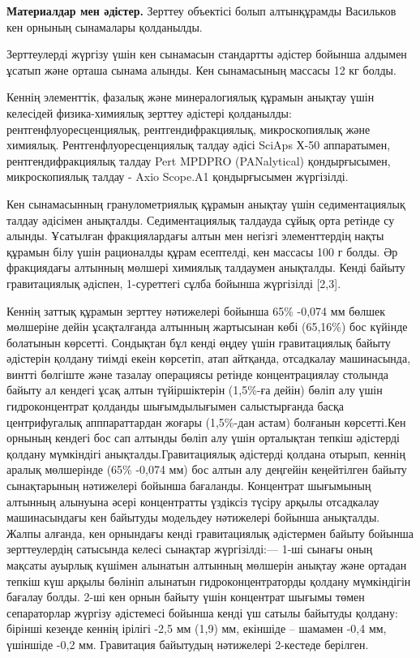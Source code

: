 \begin{multicols}{2}

{\bfseries Материалдар мен әдістер.} Зерттеу объектісі болып алтынқұрамды
Васильков кен орнының сынамалары қолданылды.

Зерттеулерді жүргізу үшін кен сынамасын стандартты әдістер бойынша
алдымен ұсатып және орташа сынама алынды. Кен сынамасының массасы 12 кг
болды.

Кеннің элементтік, фазалық және минералогиялық құрамын анықтау үшін
келесідей физика-химиялық зерттеу әдістері қолданылды:
рентгенфлуоресценциялық, рентгендифракциялық, микроскопиялық және
химиялық. Рентгенфлуоресценциялық талдау әдісі SciAps Х-50 аппаратымен,
рентгендифракциялық талдау Pert MPDPRO (PANalytical) қондырғысымен,
микроскопиялық талдау - Axio Scope.A1 қондырғысымен жүргізілді.

Кен сынамасынның гранулометриялық құрамын анықтау үшін седиментациялық
талдау әдісімен анықталды. Седиментациялық талдауда сұйық орта ретінде
су алынды. Ұсатылған фракциялардағы алтын мен негізгі элементтердің
нақты құрамын білу үшін рационалды құрам есептелді, кен массасы 100 г
болды. Әр фракциядағы алтынның мөлшері химиялық талдаумен анықталды.
Кенді байыту гравитациялық әдіспен, 1-суреттегі сұлба бойынша жүргізілді
{[}2,3{]}.

Кеннің заттық құрамын зерттеу нәтижелері бойынша 65\% -0,074 мм бөлшек
мөлшеріне дейін ұсақталғанда алтынның жартысынан көбі (65,16\%) бос
күйінде болатынын көрсетті. Сондықтан бұл кенді өңдеу үшін гравитациялық
байыту әдістерін қолдану тиімді екеін көрсетіп, атап айтқанда,
отсадкалау машинасында, винтті бөлгіште және тазалау операциясы ретінде
концентрациялау столында байыту ал кендегі ұсақ алтын түйіршіктерін
(1,5\%-ға дейін) бөліп алу үшін гидроконцентрат қолданды шығымдылығымен
салыстырғанда басқа центрифугалық апппараттардан жоғары (1,5\%-дан
астам) болғанын көрсетті.Кен орнының кендегі бос сап алтынды бөліп алу
үшін орталықтан тепкіш әдістерді қолдану мүмкіндігі
анықталды.Гравитациялық әдістерді қолдана отырып, кеннің аралық
мөлшерінде (65\% -0,074 мм) бос алтын алу деңгейін кеңейтілген байыту
сынақтарының нәтижелері бойынша бағаланды. Концентрат шығымының алтынның
алынуына әсері концентратты үздіксіз түсіру арқылы отсадкалау
машинасындағы кен байытуды модельдеу нәтижелері бойынша анықталды. Жалпы
алғанда, кен орнындағы кенді гравитациялық әдістермен байыту бойынша
зерттеулердің сатысында келесі сынақтар жүргізілді:--- 1-ші сынағы оның
мақсаты ауырлық күшімен алынатын алтынның мөлшерін анықтау және ортадан
тепкіш күш арқылы бөлініп алынатын гидроконцентраторды қолдану
мүмкіндігін бағалау болды. 2-ші кен орнын байыту үшін концентрат шығымы
төмен сепараторлар жүргізу әдістемесі бойынша кенді үш сатылы байытуды
қолдану: бірінші кезеңде кеннің ірілігі -2,5 мм (1,9) мм, екіншіде --
шамамен -0,4 мм, үшіншіде -0,2 мм. Гравитация байытудың нәтижелері
2-кестеде берілген.


\end{multicols}
